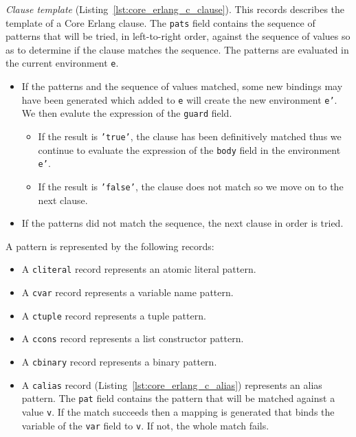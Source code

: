 
\emph{Clause template} (Listing~\ref{lst:core_erlang_c_clause}).
This records describes the template of a Core Erlang clause. The \texttt{pats}
field contains the sequence of patterns that will be tried, in left-to-right order,
against the sequence of values so as to determine if the clause matches the
sequence. The patterns are evaluated in the current environment \texttt{e}.

\begin{itemize}
  \item If the patterns and the sequence of values matched, some new bindings
    may have been generated which added to \texttt{e} will create the new
    environment \texttt{e'}. We then evalute the expression of the
    \texttt{guard} field. 
    \begin{itemize}
      \item If the result is \texttt{'true'}, the clause has been definitively
        matched thus we continue to evaluate the expression of the
        \texttt{body} field in the environment \texttt{e'}.
      \item If the result is \texttt{'false'}, the clause does not match so we
        move on to the next clause.
    \end{itemize}
  \item If the patterns did not match the sequence, the next clause in order is
    tried.
\end{itemize}

A pattern is represented by the following records:

\begin{itemize}
  \item A \texttt{c\textunderscore literal} record represents an atomic literal pattern.
  \item A \texttt{c\textunderscore var} record represents a variable name pattern.
  \item A \texttt{c\textunderscore tuple} record represents a tuple pattern.
  \item A \texttt{c\textunderscore cons} record represents a list constructor pattern.
  \item A \texttt{c\textunderscore binary} record represents a binary pattern.
  \item A \texttt{c\textunderscore alias} record (Listing~\ref{lst:core_erlang_c_alias}) represents an alias pattern.
    The \texttt{pat} field contains the pattern that will be matched against a
    value \texttt{v}. If the match succeeds then a mapping is generated that
    binds the variable of the \texttt{var} field to \texttt{v}. If not, the
    whole match fails.
\end{itemize}




